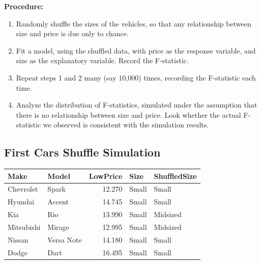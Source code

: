 \documentclass[]{book}
\newenvironment{Shaded}{\begin{snugshade}}{\end{snugshade}}
\newcommand{\KeywordTok}[1]{\textcolor[rgb]{0.13,0.29,0.53}{\textbf{#1}}}
\newcommand{\DecValTok}[1]{\textcolor[rgb]{0.00,0.00,0.81}{#1}}
\newcommand{\StringTok}[1]{\textcolor[rgb]{0.31,0.60,0.02}{#1}}
\newcommand{\OperatorTok}[1]{\textcolor[rgb]{0.81,0.36,0.00}{\textbf{#1}}}
\newcommand{\NormalTok}[1]{#1}
\begin{document}
\textbf{Procedure:}

\begin{enumerate}
\def\labelenumi{\arabic{enumi}.}
\item
  Randomly shuffle the sizes of the vehicles, so that any relationship
  between size and price is due only to chance.
\item
  Fit a model, using the shuffled data, with price as the response
  variable, and size as the explanatory variable. Record the
  F-statistic.
\item
  Repeat steps 1 and 2 many (say 10,000) times, recording the
  F-statistic each time.
\item
  Analyze the distribution of F-statistics, simulated under the
  assumption that there is no relationship between size and price. Look
  whether the actual F-statistic we observed is consistent with the
  simulation results.
\end{enumerate}

\subsection{First Cars Shuffle
Simulation}\label{first-cars-shuffle-simulation-1}

\begin{Shaded}
\end{Shaded}

\begin{tabular}{l|l|r|l|l}
\hline
Make & Model & LowPrice & Size & ShuffledSize\\
\hline
Chevrolet & Spark & 12.270 & Small & Small\\
\hline
Hyundai & Accent & 14.745 & Small & Small\\
\hline
Kia & Rio & 13.990 & Small & Midsized\\
\hline
Mitsubishi & Mirage & 12.995 & Small & Midsized\\
\hline
Nissan & Versa Note & 14.180 & Small & Small\\
\hline
Dodge & Dart & 16.495 & Small & Small\\
\hline
\end{tabular}
\end{document}
